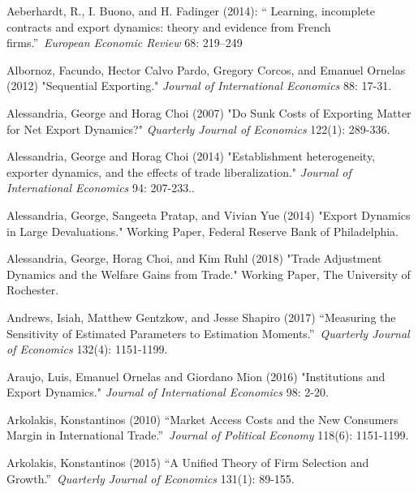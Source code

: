 \documentclass[12pt]{article}
\begin{document}
\begin{description}
\item Aeberhardt, R., I. Buono, and H. Fadinger (2014): \textquotedblleft
Learning, incomplete contracts and export dynamics: theory and evidence from
French firms.\textquotedblright\ \textit{European Economic Review} 68:
219--249

\item Albornoz, Facundo, Hector Calvo Pardo, Gregory Corcos, and Emanuel
Ornelas (2012) "Sequential Exporting." \textit{Journal of International
Economics} 88: 17-31.

\item Alessandria, George and Horag Choi (2007) "Do Sunk Costs of Exporting
Matter for Net Export Dynamics?" \textit{Quarterly Journal of Economics} 122(1):
289-336.

\item Alessandria, George and Horag Choi (2014) "Establishment
heterogeneity, exporter dynamics, and the effects of trade liberalization." 
\textit{Journal of International Economics} 94: 207-233..

\item Alessandria, George, Sangeeta Pratap, and Vivian Yue (2014) "Export
Dynamics in Large Devaluations." Working Paper, Federal Reserve Bank of
Philadelphia.

\item Alessandria, George, Horag Choi, and Kim Ruhl (2018) "Trade Adjustment
Dynamics and the Welfare Gains from Trade." Working Paper, The University of
Rochester.

\item Andrews, Isiah, Matthew Gentzkow, and Jesse Shapiro  (2017) \textquotedblleft Measuring the Sensitivity of Estimated Parameters to Estimation Moments.\textquotedblright\ 
\textit{Quarterly Journal of Economics} 132(4): 1151-1199.

\item Araujo, Luis, Emanuel Ornelas and Giordano Mion (2016) "Institutions
and Export Dynamics." \textit{Journal of International Economics }98: 2-20.

\item Arkolakis, Konstantinos (2010) \textquotedblleft Market Access Costs
and the New Consumers Margin in International Trade.\textquotedblright\ 
\textit{Journal of Political Economy} 118(6): 1151-1199.

\item Arkolakis, Konstantinos (2015) \textquotedblleft A Unified Theory of
Firm Selection and Growth.\textquotedblright\ \textit{Quarterly Journal of
Economics} 131(1): 89-155.


\end{description}
\end{document}

